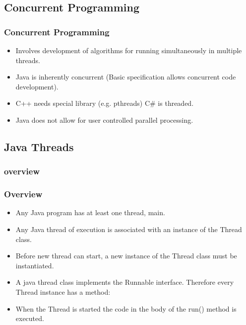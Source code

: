 \documentclass{beamer}
\begin{document}
\subsection{Concurrent Programming}
\begin{frame}
\frametitle{Concurrent Programming}
\begin{itemize}
\item Involves development of algorithms for running {\color{red}simultaneously} in {\color{red}multiple threads}.
\item Java is inherently concurrent (Basic specification allows concurrent code development).
\item C++ needs special library (e.g. pthreads) {\color{blue}C\# is threaded}.
\item Java does not allow for user controlled parallel processing.
\end{itemize}
\end{frame}

\subsection{Java Threads}
\subsubsection{overview}
\begin{frame}[fragile] %
\frametitle{Overview}
\begin{itemize}
\item Any Java program has at least one thread, {\color{red}main}.
\item Any Java thread of execution is associated with an {\color{blue}instance} of the {\color{green} Thread} class.
\item Before new thread can start, a new instance of the {\color{green} Thread} class must be {\color{blue}instantiated}.
\item A java thread class implements the {\color{purple} Runnable} interface. Therefore every {\color{green} Thread} instance has a method:
\end{itemize}
\lstI
\begin{itemize}
\item When the {\color{green} Thread} is {\color{orange} started} the code in the body of the {\color{magenta} run()} method is executed.
\end{itemize}

\end{frame}
\end{document}
